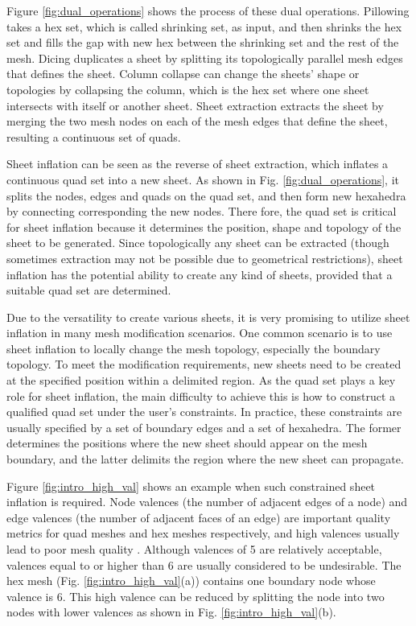 \documentclass[final,5p,times,twocolumn]{elsarticle}
\begin{document}
Figure \ref{fig:dual_operations} shows the process of these dual operations. Pillowing takes a hex set, which is called shrinking set, as input, and then shrinks the hex set and fills the gap with new hex between the shrinking set and the rest of the mesh. Dicing duplicates a sheet by splitting its topologically parallel mesh edges that defines the sheet. Column collapse can change the sheets' shape or topologies by collapsing the column, which is the hex set where one sheet intersects with itself or another sheet. Sheet extraction extracts the sheet by merging the two mesh nodes on each of the mesh edges that define the sheet, resulting a continuous set of quads.

Sheet inflation can be seen as the reverse of sheet extraction, which inflates a continuous quad set into a new sheet. As shown in Fig. \ref{fig:dual_operations}, it splits the nodes, edges and quads on the quad set, and then form new hexahedra by connecting corresponding the new nodes. There fore, the quad set is critical for sheet inflation because it determines the position, shape and topology of the sheet to be generated. Since topologically any sheet can be extracted (though sometimes extraction may not be possible due to geometrical restrictions), sheet inflation has the potential ability to create any kind of sheets, provided that a suitable quad set are determined.

Due to the versatility to create various sheets, it is very promising to utilize sheet inflation in many mesh modification scenarios. One common scenario is to use sheet inflation to locally change the mesh topology, especially the boundary topology. To meet the modification requirements, new sheets need to be created at the specified position within a delimited region. As the quad set plays a key role for sheet inflation, the main difficulty to achieve this is how to construct a qualified quad set under the user's constraints. In practice, these constraints are usually specified by a set of boundary edges and a set of hexahedra. The former determines the positions where the new sheet should appear on the mesh boundary, and the latter delimits the region where the new sheet can propagate.

Figure \ref{fig:intro_high_val} shows an example when such constrained sheet inflation is required. Node valences (the number of adjacent edges of a node) and edge valences (the number of adjacent faces of an edge) are important quality metrics for quad meshes and hex meshes respectively, and high valences usually lead to poor mesh quality  \cite{anderson2009automatic,canann1998topological,millerusing,Staten2010d}. Although valences of 5 are relatively acceptable, valences equal to or higher than 6 are usually considered to be undesirable. The hex mesh (Fig. \ref{fig:intro_high_val}(a)) contains one boundary node whose valence is 6. This high valence can be reduced by splitting the node into two nodes with lower valences as shown in Fig. \ref{fig:intro_high_val}(b).
\end{document}
